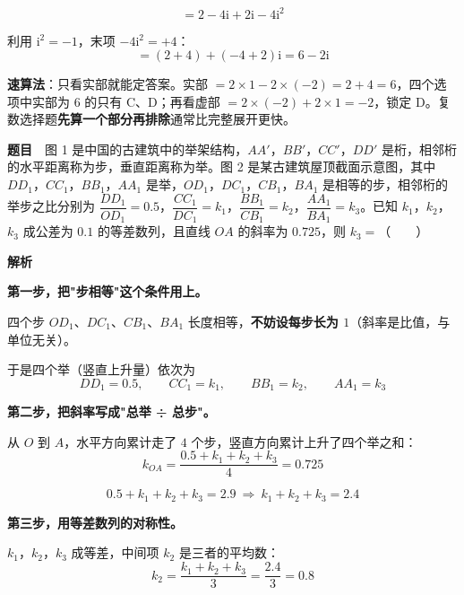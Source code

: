\[=2-4\mathrm i+2\mathrm i-4\mathrm i^{2}\]

利用 $\mathrm i^{2}=-1$，末项 $-4\mathrm i^{2}=+4$：
\[=(2+4)+(-4+2)\mathrm i=6-2\mathrm i\]


\begin{gktip}
\textbf{速算法}：只看实部就能定答案。实部 $=2\times1-2\times(-2)=2+4=6$，四个选项中实部为 $6$ 的只有 C、D；再看虚部 $=2\times(-2)+2\times1=-2$，锁定 D。复数选择题\textbf{先算一个部分再排除}通常比完整展开更快。
\end{gktip}

\par\medskip


\textbf{题目}　图 1 是中国的古建筑中的举架结构，$AA'$，$BB'$，$CC'$，$DD'$ 是桁，相邻桁的水平距离称为步，垂直距离称为举。图 2 是某古建筑屋顶截面示意图，其中 $DD_1$，$CC_1$，$BB_1$，$AA_1$ 是举，$OD_1$，$DC_1$，$CB_1$，$BA_1$ 是相等的步，相邻桁的举步之比分别为 $\dfrac{DD_1}{OD_1}=0.5$，$\dfrac{CC_1}{DC_1}=k_1$，$\dfrac{BB_1}{CB_1}=k_2$，$\dfrac{AA_1}{BA_1}=k_3$。已知 $k_1$，$k_2$，$k_3$ 成公差为 $0.1$ 的等差数列，且直线 $OA$ 的斜率为 $0.725$，则 $k_3=$（　　）

\begin{center}\end{center}

\begin{center}\end{center}

\textbf{解析}

\textbf{第一步，把"步相等"这个条件用上。}

四个步 $OD_1$、$DC_1$、$CB_1$、$BA_1$ 长度相等，\textbf{不妨设每步长为 $1$}（斜率是比值，与单位无关）。

于是四个举（竖直上升量）依次为
\[DD_1=0.5,\qquad CC_1=k_1,\qquad BB_1=k_2,\qquad AA_1=k_3\]

\textbf{第二步，把斜率写成"总举 ÷ 总步"。}

从 $O$ 到 $A$，水平方向累计走了 $4$ 个步，竖直方向累计上升了四个举之和：
\[k_{OA}=\frac{0.5+k_1+k_2+k_3}{4}=0.725\]

\[0.5+k_1+k_2+k_3=2.9\ \Longrightarrow\ k_1+k_2+k_3=2.4\]

\textbf{第三步，用等差数列的对称性。}

$k_1$，$k_2$，$k_3$ 成等差，中间项 $k_2$ 是三者的平均数：
\[k_2=\frac{k_1+k_2+k_3}3=\frac{2.4}3=0.8\]

